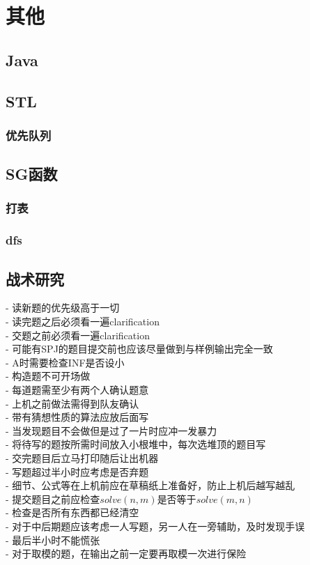 \documentclass[twocolumn,a4]{article}%
\begin{document}
\section{其他}
\subsection{Java}

\subsection{STL}
    \subsubsection{优先队列}
    
\subsection{SG函数}
    
    \subsubsection{打表}
    
    \subsubsection{dfs}
    
\subsection{战术研究}
    - 读新题的优先级高于一切\\
    - 读完题之后必须看一遍clarification\\
    - 交题之前必须看一遍clarification\\
    - 可能有SPJ的题目提交前也应该尽量做到与样例输出完全一致\\
    - A时需要检查INF是否设小\\
    - 构造题不可开场做\\
    - 每道题需至少有两个人确认题意\\
    - 上机之前做法需得到队友确认\\
    - 带有猜想性质的算法应放后面写\\
    - 当发现题目不会做但是过了一片时应冲一发暴力\\
    - 将待写的题按所需时间放入小根堆中，每次选堆顶的题目写\\
    - 交完题目后立马打印随后让出机器\\
    - 写题超过半小时应考虑是否弃题\\
    - 细节、公式等在上机前应在草稿纸上准备好，防止上机后越写越乱\\
    - 提交题目之前应检查$solve(n,m)$是否等于$solve(m,n)$\\
    - 检查是否所有东西都已经清空\\
    - 对于中后期题应该考虑一人写题，另一人在一旁辅助，及时发现手误\\
    - 最后半小时不能慌张\\
    - 对于取模的题，在输出之前一定要再取模一次进行保险\\
\end{document}
